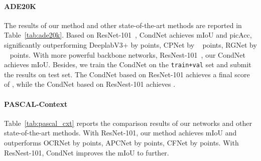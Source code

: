 \documentclass[journal]{IEEEtran}
\begin{document}
\paragraph{ADE20K}
The results of our method 
and other state-of-the-art methods are reported in Table~\ref{tab:ade20k}.
Based on ResNet-101~\cite{He-CVPR-ResNet-2016}, 
CondNet achieves  mIoU and  picAcc, 
significantly outperforming 
DeeplabV3+ by  points,
CPNet by   points, RGNet by   points.
With more powerful backbone networks, ResNest-101~\cite{Zhang-ARXIV-ResNest-2020}, our CondNet achieves  mIoU.
Besides,
we train the CondNet on the \texttt{train+val} set 
and submit the results on test set.
The CondNet based on ResNet-101 achieves
a final score of ,
while the CondNet based on ResNest-101 achieves
.






\paragraph{PASCAL-Context}
Table~\ref{tab:pascal_cxt} reports the comparison results
of our networks and other state-of-the-art methods.
With ResNet-101, our method achieves  mIoU
and outperforms 
OCRNet by  points, APCNet by  points, CFNet by  points.
With ResNest-101, CondNet improves the mIoU to  further.
\end{document}
